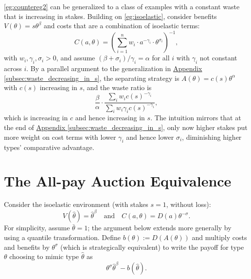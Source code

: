 \documentclass[12 pt]{article}
\newcommand{\appendixref}[1]{\hyperref[#1]{Appendix \ref{#1}}}
\theoremstyle{remark}
\theoremstyle{definition}
\begin{document}
\autoref{eg:countereg2} can be generalized to a class of examples with a constant waste that is increasing in stakes. Building on \autoref{eg:isoelastic}, consider benefits $V(\theta) = s\theta^\beta$ and costs that are a combination of isoelastic terms: $$C(a,\theta) = \left( \sum_{i=1}^n w_i \cdot a^{-\gamma_i} \cdot \theta^{\sigma_i} \right)^{-1},$$ with $w_i, \gamma_i,\sigma_i > 0$, and assume $(\beta + \sigma_i)/\gamma_i = \alpha$ for all $i$ with $\gamma_i$ not constant across $i$. By a parallel argument to the generalization in \appendixref{subsec:waste_decreasing_in_s}, the separating strategy is $A(\theta) = c(s)\theta^\alpha$ with $c(s)$ increasing in $s$, and the waste ratio is $$\frac{\beta}{\alpha} \cdot \frac{\sum_i w_i c(s)^{-\gamma_i}}{\sum_i w_i \gamma_i c(s)^{-\gamma_i}},$$ which is increasing in $c$ and hence increasing in $s$. %
The intuition mirrors that at the end of \appendixref{subsec:waste_decreasing_in_s}, only now higher stakes put more weight on cost terms with lower $\gamma_i$ and hence lower $\sigma_i$, diminishing higher types' comparative advantage.

\section{The All-pay Auction Equivalence}
\label{sec:all-pay}


Consider the isoelastic environment (with stakes $s=1$, without loss): $$V(\hat \theta)=\hat \theta^\beta \quad \text{and} \quad C(a,\theta)=D(a)\theta^{-\sigma}.$$ For simplicity, assume $\bar \theta=1$; the argument below extends more generally by using a quantile transformation. Define $b(\theta):=D(A(\theta))$ and multiply costs and benefits by $\theta^\sigma$ (which is strategically equivalent) to write the payoff for type $\theta$ choosing to mimic type $\hat \theta$ as
\begin{equation}
\label{e:auction}
\theta^\sigma \hat \theta^\beta  - b(\hat \theta). 
\end{equation}
\end{document}
